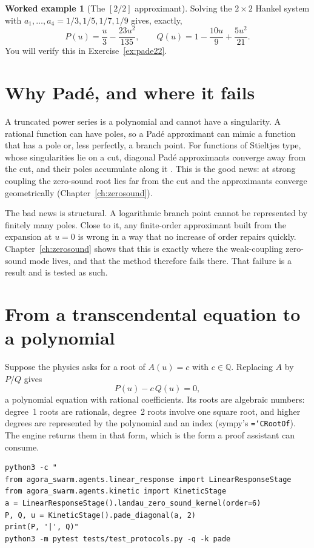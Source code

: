 \documentclass[11pt,a4paper,openany]{book}
\newcommand{\code}[1]{\texttt{\hyphenchar\font=`\-\relax #1}}
\newcommand{\Q}{\mathbb{Q}}
\theoremstyle{definition}
\newtheorem{example}{Worked example}[chapter]
\theoremstyle{plain}
\begin{document}
\begin{example}[{The $[2/2]$ approximant}]
Solving the $2\times2$ Hankel system with $a_1,\dots,a_4=1/3,1/5,1/7,1/9$ gives, exactly,
\[
  P(u)=\frac u3-\frac{23u^2}{135},\qquad Q(u)=1-\frac{10u}{9}+\frac{5u^2}{21}.
\]
You will verify this in Exercise~\ref{ex:pade22}.
\end{example}

\section{Why Padé, and where it fails}

A truncated power series is a polynomial and cannot have a singularity. A rational function can
have poles, so a Padé approximant can mimic a function that has a pole or, less perfectly, a branch
point. For functions of Stieltjes type, whose singularities lie on a cut, diagonal Padé
approximants converge away from the cut, and their poles accumulate along it
\cite{bakergravesmorris}. This is the good news: at strong coupling the zero-sound root lies far
from the cut and the approximants converge geometrically (Chapter~\ref{ch:zerosound}).

The bad news is structural. A logarithmic branch point cannot be represented by finitely many
poles. Close to it, any finite-order approximant built from the expansion at $u=0$ is wrong in a
way that no increase of order repairs quickly. Chapter~\ref{ch:zerosound} shows that this is
exactly where the weak-coupling zero-sound mode lives, and that the method therefore fails there.
That failure is a result and is tested as such.

\section{From a transcendental equation to a polynomial}

Suppose the physics asks for a root of $A(u)=c$ with $c\in\Q$. Replacing $A$ by $P/Q$ gives
\[
  P(u)-c\,Q(u)=0,
\]
a polynomial equation with rational coefficients. Its roots are algebraic numbers: degree~1 roots
are rationals, degree~2 roots involve one square root, and higher degrees are represented by the
polynomial and an index (sympy's \code{CRootOf}). The engine returns them in that form, which is
the form a proof assistant can consume.

\begin{runit}
\begin{verbatim}
python3 -c "
from agora_swarm.agents.linear_response import LinearResponseStage
from agora_swarm.agents.kinetic import KineticStage
a = LinearResponseStage().landau_zero_sound_kernel(order=6)
P, Q, u = KineticStage().pade_diagonal(a, 2)
print(P, '|', Q)"
python3 -m pytest tests/test_protocols.py -q -k pade
\end{verbatim}
\end{runit}
\end{document}
